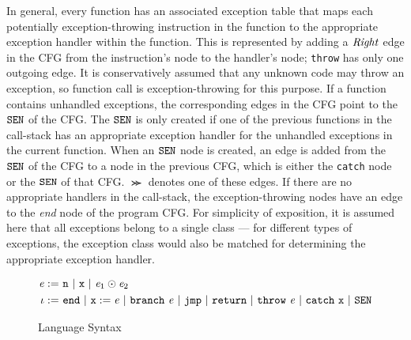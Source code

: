 In general, every function has an associated exception table that maps
each potentially exception-throwing instruction in the function to the 
appropriate exception handler within the function. This is represented
by adding a $\mathit{Right}$ edge in the CFG from the instruction's node to
the handler's node; \texttt{throw} has only one outgoing edge. 
It is conservatively assumed that any unknown code may throw an
exception, so function call is exception-throwing for this purpose. If a
function contains unhandled exceptions, the corresponding edges in the
CFG point to the $\texttt{SEN}$ of the CFG. The $\texttt{SEN}$ is only created if one
of the previous functions in the call-stack has an appropriate exception
handler for the unhandled exceptions in the current function. When an
$\texttt{SEN}$ node is created, an edge is added from the $\texttt{SEN}$ of the CFG to
a node in the previous CFG, which is either the \texttt{catch} node or
the $\texttt{SEN}$ of that CFG. $\Succ$ denotes one of these edges. If there
are no appropriate handlers in the call-stack, the exception-throwing
nodes have an edge to the \emph{end} node of the program CFG. For 
simplicity of exposition, it is assumed here that all exceptions
belong to a single class --- for different types of exceptions, the
exception class would also be matched for determining the appropriate 
exception handler.  

\begin{figure}
\begin{align*}
\mathit{e}	:=~& \texttt{n}~\arrowvert~\texttt{x} ~\arrowvert~\mathit{e}_1 \odot \mathit{e}_2 \\
\iota :=~& \texttt{end}~\arrowvert~\texttt{x} := \mathit{e}~\arrowvert~
           \texttt{branch}~\mathit{e}~\arrowvert~ \texttt{jmp}~\arrowvert~ \texttt{return}~\arrowvert~
           \texttt{throw}~\mathit{e}~\arrowvert~\texttt{catch}~\texttt{x}~\arrowvert~\texttt{SEN}~
\end{align*}
\caption{Language Syntax}\label{fig:exc:syntax}
\end{figure}  

